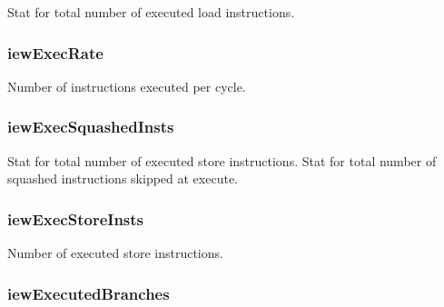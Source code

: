 \label{classDefaultIEW_ad576ced7a991ca05c24bc21fc9d70cdc}
Stat for total number of executed load instructions. \hypertarget{classDefaultIEW_a455816a7fa7ff2a5fa41cc7e7486d91b}{
\subsubsection[{iewExecRate}]{ {\bf iewExecRate}}}
\label{classDefaultIEW_a455816a7fa7ff2a5fa41cc7e7486d91b}
Number of instructions executed per cycle. \hypertarget{classDefaultIEW_a822e0e5fd3e050a7b48437eab389be0a}{
\subsubsection[{iewExecSquashedInsts}]{ {\bf iewExecSquashedInsts}}}
\label{classDefaultIEW_a822e0e5fd3e050a7b48437eab389be0a}
Stat for total number of executed store instructions. Stat for total number of squashed instructions skipped at execute. \hypertarget{classDefaultIEW_a26e3fec9b7902bf996fbe1755c5bd063}{
\subsubsection[{iewExecStoreInsts}]{ {\bf iewExecStoreInsts}}}
\label{classDefaultIEW_a26e3fec9b7902bf996fbe1755c5bd063}
Number of executed store instructions. \hypertarget{classDefaultIEW_a69db59d35af8f8904b1e176cb611fc9b}{
\subsubsection[{iewExecutedBranches}]{ {\bf iewExecutedBranches}}}

